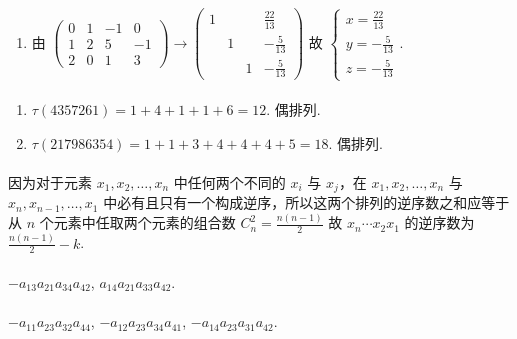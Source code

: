 \begin{enumerate}
			\item %
			      由 $\begin{pmatrix}
					      0 & 1 & -1 & 0  \\
					      1 & 2 & 5  & -1 \\
					      2 & 0 & 1  & 3
				      \end{pmatrix} \to \begin{pmatrix}
					      1 &   &   & \frac{22}{13} \\
					        & 1 &   & -\frac{5}{13} \\
					        &   & 1 & -\frac{5}{13}
				      \end{pmatrix}$ 故 $\begin{cases}
					      x=\frac{22}{13} \\
					      y=-\frac{5}{13} \\
					      z=-\frac{5}{13}
				      \end{cases}$.
		\end{enumerate}


	\paragraph{} %
		\begin{enumerate}
			\item %
			      $\tau(4357261) = 1+4+1+1+6 = 12$. 偶排列.

			\item %
			      $\tau(217986354) = 1+1+3+4+4+4+5 = 18$. 偶排列.
		\end{enumerate}


	\paragraph{} %
		因为对于元素 $x_1,x_2,\dots,x_n$ 中任何两个不同的 $x_i$ 与 $x_j$，在 $x_1,x_2,\dots,x_n$ 与 $x_n,x_{n-1},\dots,x_1$ 中必有且只有一个构成逆序，所以这两个排列的逆序数之和应等于从 $n$ 个元素中任取两个元素的组合数 $C_n^2 = \frac{n(n-1)}{2}$
		故 $x_n \cdots x_2x_1$ 的逆序数为 $\frac{n(n-1)}{2} - k$.


	\paragraph{} %
		$-a_{13}a_{21}a_{34}a_{42}$, $a_{14}a_{21}a_{33}a_{42}$.


	\paragraph{} %
		$-a_{11}a_{23}a_{32}a_{44}$, $-a_{12}a_{23}a_{34}a_{41}$, $-a_{14}a_{23}a_{31}a_{42}$.



